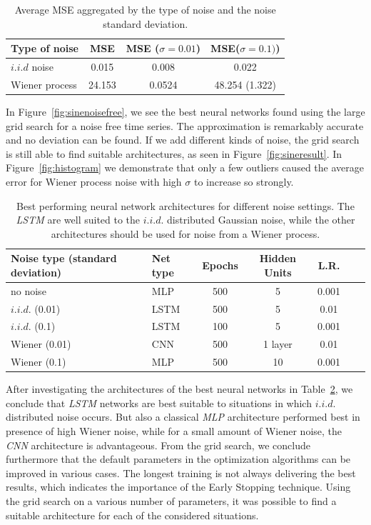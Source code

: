 \begin{table}
    \centering
    \begin{tabular}{l|ccc}
        Type of noise & MSE & MSE ($\sigma=0.01$) & MSE($\sigma=0.1)$) \\
        \hline
        $i.i.d$ noise &   0.015 & 0.008  &  0.022 \\
        Wiener process & 24.153 & 0.0524 & 48.254 (1.322) \\
    \end{tabular}
    \caption{Average MSE aggregated by the type of noise and the noise
        standard deviation.}
    \label{tab:wiener_iid}
\end{table}

In Figure~\ref{fig:sinenoisefree}, we see the best neural networks found using 
the large grid search for a noise free time series. The approximation is 
remarkably accurate and no deviation can be found. If we add different kinds of 
noise, the grid search is still able to find suitable architectures, 
as seen in Figure~\ref{fig:sineresult}. In Figure~\ref{fig:histogram}
we demonstrate that only a few outliers caused the average error 
for Wiener process noise with high $\sigma$ to increase so strongly.

\begin{table}
    \begin{tabular}{l|lccccl}
        Noise type (standard deviation) & Net type & Epochs & Hidden Units & L.R.\\
        \hline
        no noise        & MLP   & 500 & 5   & 0.001 \\
        $i.i.d.$ (0.01) & LSTM  & 500 & 5   & 0.01 \\
        $i.i.d.$ (0.1)  & LSTM  & 100 & 5   & 0.001 \\
        Wiener (0.01)   & CNN   & 500 & 1 layer   & 0.01 \\
        Wiener (0.1)    & MLP   & 500 & 10  & 0.001 \\
    \end{tabular}
    \caption{Best performing neural network architectures for different noise 
    settings. The \emph{LSTM} are well suited to the $i.i.d.$ distributed 
    Gaussian noise, while the other architectures should be used for noise 
    from a Wiener process.}
    \label{tab:architectures}
\end{table}

After 
investigating the architectures of the best neural networks in 
Table~\ref{tab:architectures}, we conclude that \emph{LSTM} networks are best 
suitable to situations in which $i.i.d.$ distributed 
noise occurs. But also a 
classical \emph{MLP} architecture performed best in presence of high Wiener
noise, while for a small amount
of Wiener noise, the \emph{CNN} architecture is advantageous. From the 
grid search, we conclude furthermore that the default parameters in the 
optimization algorithms can be improved in various cases. The longest training
is not always delivering the best results, which indicates the importance of 
the Early Stopping technique. Using the grid search on a various number of
parameters, it was possible to find a suitable architecture for each of the
considered situations.

